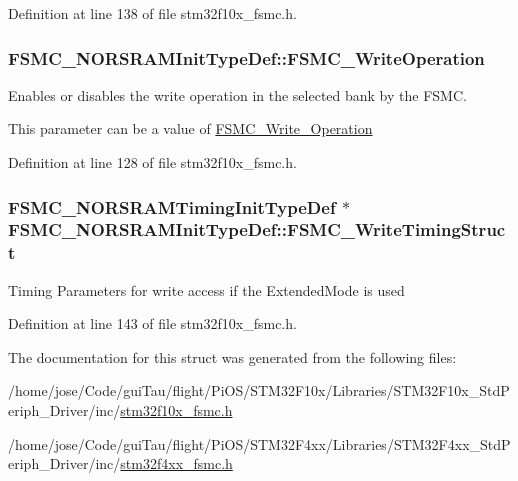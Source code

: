 Definition at line 138 of file stm32f10x\-\_\-fsmc.\-h.

\hypertarget{struct_f_s_m_c___n_o_r_s_r_a_m_init_type_def_a596793d1735c4e38c87e3bf91d986370}{
\subsubsection[{F\-S\-M\-C\-\_\-\-Write\-Operation}]{ F\-S\-M\-C\-\_\-\-N\-O\-R\-S\-R\-A\-M\-Init\-Type\-Def\-::\-F\-S\-M\-C\-\_\-\-Write\-Operation}}\label{struct_f_s_m_c___n_o_r_s_r_a_m_init_type_def_a596793d1735c4e38c87e3bf91d986370}
\begin{DoxyVerb}      Enables or disables the write operation in the selected bank by the FSMC. 
\end{DoxyVerb}
 This parameter can be a value of \hyperlink{group___f_s_m_c___write___operation}{F\-S\-M\-C\-\_\-\-Write\-\_\-\-Operation} 

Definition at line 128 of file stm32f10x\-\_\-fsmc.\-h.

\hypertarget{struct_f_s_m_c___n_o_r_s_r_a_m_init_type_def_a4ca9ddc4f0dbad8192d672e78bf3be3d}{
\subsubsection[{F\-S\-M\-C\-\_\-\-Write\-Timing\-Struct}]{\setlength{\rightskip}{0pt plus 5cm}F\-S\-M\-C\-\_\-\-N\-O\-R\-S\-R\-A\-M\-Timing\-Init\-Type\-Def $\ast$ F\-S\-M\-C\-\_\-\-N\-O\-R\-S\-R\-A\-M\-Init\-Type\-Def\-::\-F\-S\-M\-C\-\_\-\-Write\-Timing\-Struct}}\label{struct_f_s_m_c___n_o_r_s_r_a_m_init_type_def_a4ca9ddc4f0dbad8192d672e78bf3be3d}
Timing Parameters for write access if the Extended\-Mode is used 

Definition at line 143 of file stm32f10x\-\_\-fsmc.\-h.



The documentation for this struct was generated from the following files\-:\begin{DoxyCompactItemize}
\item 
/home/jose/\-Code/gui\-Tau/flight/\-Pi\-O\-S/\-S\-T\-M32\-F10x/\-Libraries/\-S\-T\-M32\-F10x\-\_\-\-Std\-Periph\-\_\-\-Driver/inc/\hyperlink{stm32f10x__fsmc_8h}{stm32f10x\-\_\-fsmc.\-h}\item 
/home/jose/\-Code/gui\-Tau/flight/\-Pi\-O\-S/\-S\-T\-M32\-F4xx/\-Libraries/\-S\-T\-M32\-F4xx\-\_\-\-Std\-Periph\-\_\-\-Driver/inc/\hyperlink{stm32f4xx__fsmc_8h}{stm32f4xx\-\_\-fsmc.\-h}\end{DoxyCompactItemize}
